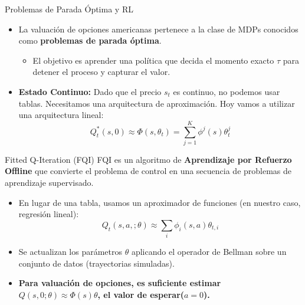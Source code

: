 \documentclass[xcolor=dvipsnames, handout]{beamer}
\begin{document}
\begin{frame}{Problemas de Parada \'Optima y RL}
 

\begin{itemize}
    \item La valuaci\'on de opciones americanas pertenece a la clase de MDPs conocidos como \textbf{problemas de parada \'optima}.
    \begin{itemize}
        \item El objetivo es aprender una política que decida el momento exacto $\tau$ para detener el proceso y capturar el valor.
    \end{itemize}
    
    \item<2-> \textbf{Estado Continuo:} Dado que el precio $s_t$ es continuo, no podemos usar tablas. Necesitamos una arquitectura de aproximaci\'on. Hoy vamos a utilizar una arquitectura lineal:
    \[ Q_t^*(s,0) \approx \Phi(s, \theta_t) = \sum_{j=1}^K \phi^j(s)\theta_t^j \]
\end{itemize}
\end{frame}


\begin{frame}{Fitted Q-Iteration (FQI)}
FQI es un algoritmo de \textbf{Aprendizaje por Refuerzo Offline} que convierte el problema de control en una secuencia de problemas de aprendizaje supervisado.

\begin{itemize}
    \item En lugar de una tabla, usamos un aproximador de funciones (en nuestro caso, regresión lineal): 
    \[ Q_t(s, a,; \theta) \approx \sum_i \phi_i(s, a) \theta_{t,i} \]
    \item Se actualizan los parámetros $\theta$ aplicando el operador de Bellman sobre un conjunto de datos (trayectorias simuladas).
     \item \textbf{Para valuaci\'on de opciones, es suficiente estimar $Q(s, 0; \theta) \approx \Phi(s) \theta$, el valor de esperar($a=0$).}
\end{itemize}
\end{frame}
\end{document}

